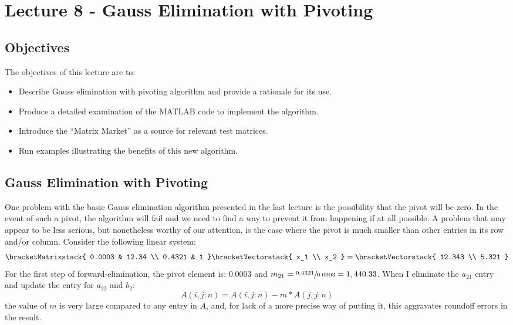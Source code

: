 \chapter{Lecture 8 - Gauss Elimination with Pivoting}
\label{ch:lec8n}
\section{Objectives}
The objectives of this lecture are to:
\begin{itemize}
\item Describe Gauss elimination with pivoting algorithm and provide a rationale for its use.
\item Produce a detailed examination of the MATLAB code to implement the algorithm.
\item Introduce the ``Matrix Market'' as a source for relevant test matrices.
\item Run examples illustrating the benefits of this new algorithm.
\end{itemize}
\setcounter{lstannotation}{0}

\section{Gauss Elimination with Pivoting}

One problem with the basic Gauss elimination algorithm presented in the last lecture is the possibility that the pivot will be zero.  In the event of such a pivot, the algorithm will fail and we need to find a way to prevent it from happening if at all possible.  A problem that may appear to be less serious, but nonetheless worthy of our attention, is the case where the pivot is much smaller than other entries in its row and/or column.  Consider the following linear system:
\begin{equation*}
\bracketMatrixstack{
0.0003 & 12.34 \\
0.4321 & 1 
}
\bracketVectorstack{
x_1 \\
x_2
}
=
\bracketVectorstack{
12.343 \\
5.321
}
\end{equation*}   
For the first step of forward-elimination, the pivot element is: 0.0003 and $m_{21} = \sfrac{0.4321}{0.0003} = 1,440.33$.  When I eliminate the $a_{21}$ entry and update the entry for $a_{22}$ and $b_2$:
\begin{equation*}
A(i,j:n) = A(i,j:n) - m*A(j,j:n)
\end{equation*}
the value of $m$ is very large compared to any entry in $A$, and, for lack of a more precise way of putting it, this aggravates roundoff errors in the result. 

